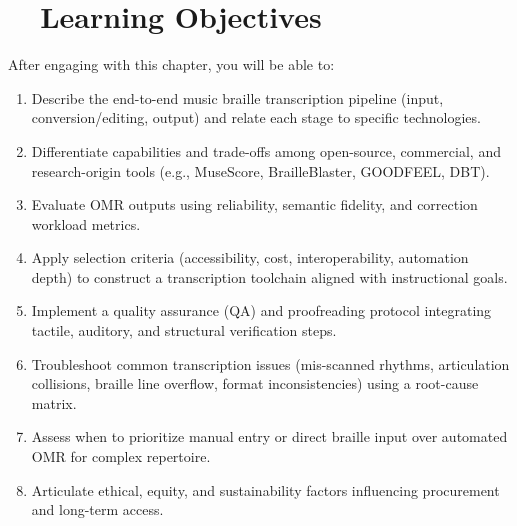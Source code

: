 \section{~~Learning Objectives}\label{ch10:sec:learning-objectives}
After engaging with this chapter, you will be able to:
\begin{enumerate}
	\item Describe the end-to-end music braille transcription pipeline (input, conversion/editing, output) and relate each stage to specific technologies.\supercite{daisy-musicxml}
	\item Differentiate capabilities and trade-offs among open-source, commercial, and research-origin tools (e.g., MuseScore, BrailleBlaster, GOODFEEL, DBT).\supercite{aph-brailleblaster, dancingdots-goodfeel, DuxburyDBT}
	\item Evaluate \gls{OMR} outputs using reliability, semantic fidelity, and correction workload metrics.\supercite{researchgate-polyphonic-omr}
	\item Apply selection criteria (accessibility, cost, interoperability, automation depth) to construct a transcription toolchain aligned with instructional goals.
	\item Implement a quality assurance (QA) and proofreading protocol integrating tactile, auditory, and structural verification steps.
	\item Troubleshoot common transcription issues (mis-scanned rhythms, articulation collisions, braille line overflow, format inconsistencies) using a root-cause matrix.
	\item Assess when to prioritize manual entry or direct braille input over automated \gls{OMR} for complex repertoire.\supercite{musescore-accessibility}
	\item Articulate ethical, equity, and sustainability factors influencing procurement and long-term access.
\end{enumerate}

